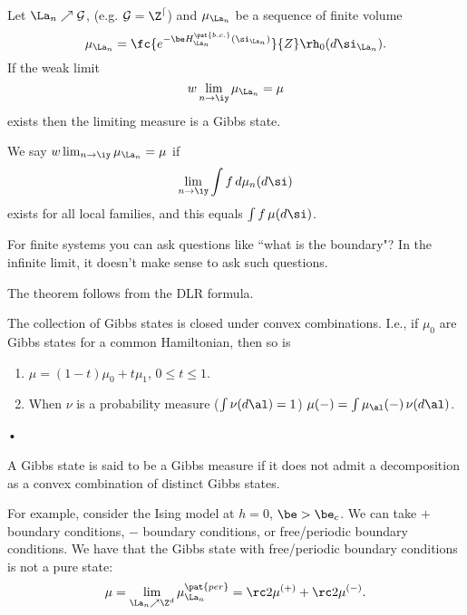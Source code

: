 \begin{thm}
Let $\La_n\nearrow \cal G$, (e.g. $\cal G=\Z^d$) and $\mu_{\La_n}$ be a sequence of finite volume 
\[
\mu_{\La_n} = \fc{e^{-\be H_{\La_n}^{\pat{b.c.}}(\si_{\La_n})}}{Z}\rh_0(d\si_{\La_n}).
\]
If the weak limit
\[
w\lim_{n\to \iy} \mu_{\La_n} = \mu
\]
exists then the limiting measure is a Gibbs state.
\end{thm}
\begin{df}
We say $w\lim_{n\to \iy} \mu_{\La_n} = \mu$ if 
\[
\lim_{n\to \iy} \int f\,d\mu_n(d\si)
\]
exists for all local families, and this equals $\int f\,\mu(d\si)$.
\end{df}
For finite systems you can ask questions like ``what is the boundary"? In the infinite limit, it doesn't make sense to ask such questions.

The theorem follows from the DLR formula.

\begin{lem}
The collection of Gibbs states is closed under convex combinations. I.e., if $\mu_0$ are Gibbs states for a common Hamiltonian, then so is 
\begin{enumerate}
\item
$\mu=(1-t)\mu_0+t\mu_1$, $0\le t\le 1$.
\item When $\nu$ is a probability measure ($\int \nu(d\al)=1$)
$\mu(-) = \int \mu_\al(-)\,\nu(d\al)$.
\end{enumerate}•
\end{lem}

\begin{df}
A Gibbs state is said to be a  Gibbs measure if it does not admit a decomposition as a convex combination of distinct Gibbs states.
\end{df}
For example, consider the Ising model at $h=0$, $\be>\be_c$. We can take $+$ boundary conditions, $-$ boundary conditions, or free/periodic boundary conditions. We have that the Gibbs state with free/periodic boundary conditions is not a pure state:
\[
\mu = \lim_{\La_n\nearrow \Z^d} \mu_{\La_n}^{\pat{per}} = \rc2 \mu^{(+)} + \rc2 \mu^{(-)}.
\]


